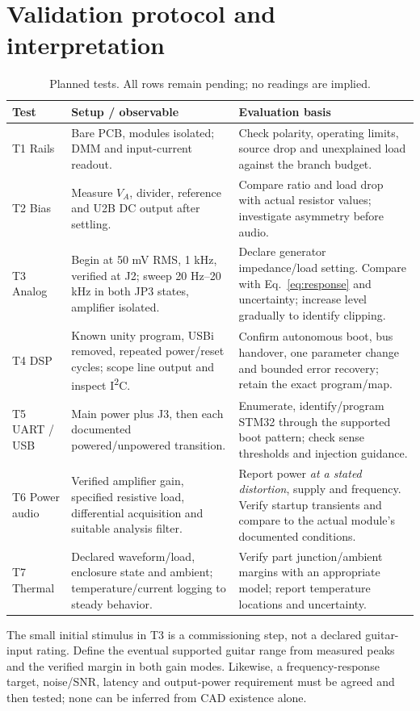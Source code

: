 \documentclass[a4paper,10pt]{article}
\newcommand{\nextsection}[1]{\clearpage\section{#1}}
\begin{document}
\nextsection{Validation protocol and interpretation}
\label{sec:tests}
\begin{table}[H]\centering\small
\caption{Planned tests. All rows remain pending; no readings are implied.}\label{tab:tests}
\begin{tabularx}{\linewidth}{P{16mm}P{45mm}Y}\toprule
Test & Setup / observable & Evaluation basis\\\midrule
T1 Rails & Bare PCB, modules isolated; DMM and input-current readout. & Check polarity, operating limits, source drop and unexplained load against the branch budget.\\
T2 Bias & Measure $V_A$, divider, reference and U2B DC output after settling. & Compare ratio and load drop with actual resistor values; investigate asymmetry before audio.\\
T3 Analog & Begin at 50 mV RMS, 1 kHz, verified at J2; sweep 20 Hz--20 kHz in both JP3 states, amplifier isolated. & Declare generator impedance/load setting. Compare with Eq.~\ref{eq:response} and uncertainty; increase level gradually to identify clipping.\\
T4 DSP & Known unity program, USBi removed, repeated power/reset cycles; scope line output and inspect I\textsuperscript{2}C. & Confirm autonomous boot, bus handover, one parameter change and bounded error recovery; retain the exact program/map.\\
T5 UART / USB & Main power plus J3, then each documented powered/unpowered transition. & Enumerate, identify/program STM32 through the supported boot pattern; check sense thresholds and injection guidance.\\
T6 Power audio & Verified amplifier gain, specified resistive load, differential acquisition and suitable analysis filter. & Report power \emph{at a stated distortion}, supply and frequency. Verify startup transients and compare to the actual module's documented conditions.\\
T7 Thermal & Declared waveform/load, enclosure state and ambient; temperature/current logging to steady behavior. & Verify part junction/ambient margins with an appropriate model; report temperature locations and uncertainty.\\\bottomrule
\end{tabularx}
\end{table}

The small initial stimulus in T3 is a commissioning step, not a declared guitar-input rating. Define the eventual supported guitar range from measured peaks and the verified margin in both gain modes. Likewise, a frequency-response target, noise/SNR, latency and output-power requirement must be agreed and then tested; none can be inferred from CAD existence alone.
\end{document}
